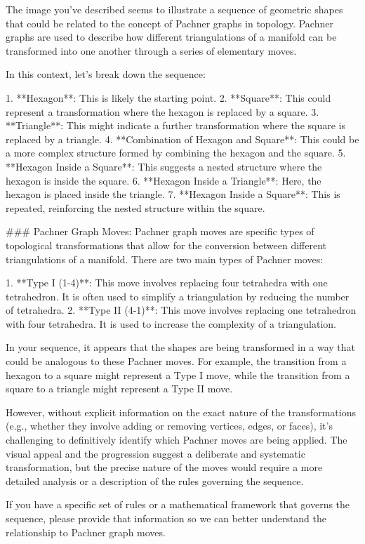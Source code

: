 The image you've described seems to illustrate a sequence of geometric shapes that could be related to the concept of Pachner graphs in topology. Pachner graphs are used to describe how different triangulations of a manifold can be transformed into one another through a series of elementary moves.

In this context, let's break down the sequence:

1. **Hexagon**: This is likely the starting point.
2. **Square**: This could represent a transformation where the hexagon is replaced by a square.
3. **Triangle**: This might indicate a further transformation where the square is replaced by a triangle.
4. **Combination of Hexagon and Square**: This could be a more complex structure formed by combining the hexagon and the square.
5. **Hexagon Inside a Square**: This suggests a nested structure where the hexagon is inside the square.
6. **Hexagon Inside a Triangle**: Here, the hexagon is placed inside the triangle.
7. **Hexagon Inside a Square**: This is repeated, reinforcing the nested structure within the square.

### Pachner Graph Moves:
Pachner graph moves are specific types of topological transformations that allow for the conversion between different triangulations of a manifold. There are two main types of Pachner moves:

1. **Type I (1-4)**: This move involves replacing four tetrahedra with one tetrahedron. It is often used to simplify a triangulation by reducing the number of tetrahedra.
2. **Type II (4-1)**: This move involves replacing one tetrahedron with four tetrahedra. It is used to increase the complexity of a triangulation.

In your sequence, it appears that the shapes are being transformed in a way that could be analogous to these Pachner moves. For example, the transition from a hexagon to a square might represent a Type I move, while the transition from a square to a triangle might represent a Type II move.

However, without explicit information on the exact nature of the transformations (e.g., whether they involve adding or removing vertices, edges, or faces), it's challenging to definitively identify which Pachner moves are being applied. The visual appeal and the progression suggest a deliberate and systematic transformation, but the precise nature of the moves would require a more detailed analysis or a description of the rules governing the sequence.

If you have a specific set of rules or a mathematical framework that governs the sequence, please provide that information so we can better understand the relationship to Pachner graph moves.